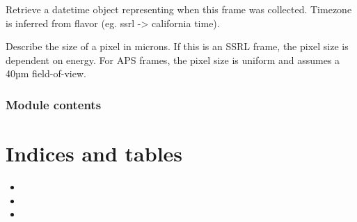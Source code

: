 \documentclass[letterpaper,10pt,english]{sphinxmanual}
\begin{document}
\begin{fulllineitems}
\begin{fulllineitems}
\end{fulllineitems}


\begin{fulllineitems}
\label{\detokenize{xanespy:xanespy.xradia.XRMFile.print_ole}}
\end{fulllineitems}


\begin{fulllineitems}
\label{\detokenize{xanespy:xanespy.xradia.XRMFile.sample_position}}
\end{fulllineitems}


\begin{fulllineitems}
\label{\detokenize{xanespy:xanespy.xradia.XRMFile.starttime}}
Retrieve a datetime object representing when this frame was
collected. Timezone is inferred from flavor (eg. ssrl -\textgreater{} california
time).

\end{fulllineitems}


\begin{fulllineitems}
\label{\detokenize{xanespy:xanespy.xradia.XRMFile.um_per_pixel}}
Describe the size of a pixel in microns. If this is an SSRL frame,
the pixel size is dependent on energy. For APS frames, the pixel size
is uniform and assumes a 40µm field-of-view.

\end{fulllineitems}


\end{fulllineitems}



\subsection{Module contents}
\label{\detokenize{xanespy:module-contents}}\label{\detokenize{xanespy:module-xanespy}}

\chapter{Indices and tables}
\label{\detokenize{index:indices-and-tables}}\begin{itemize}
\item {} 

\item {} 

\item {} 

\end{itemize}
\end{document}
